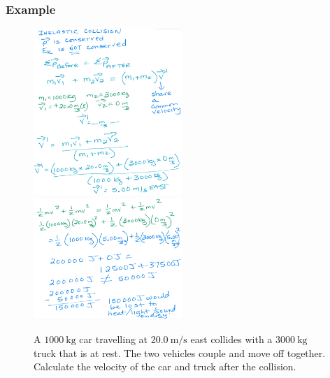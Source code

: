 \documentclass[a4paper,12pt]{article}
\begin{document}
\subsubsection{Example}
\begin{figure}[H]
    \centering
    \caption{A $\SI{1000}{\kg}$ car travelling at $\SI{20.0}{\m\per\s}$ east collides with a $\SI{3000}{\kg}$ truck that is at rest. The two vehicles couple and move off together. Calculate the velocity of the car and truck after the collision.}
    \includegraphics[width=0.5\textwidth]{q-inelastic-1}
    \includegraphics[width=0.5\textwidth]{q-inelastic-1b}
\end{figure}
\end{document}
